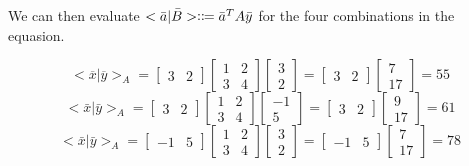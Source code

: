 \documentclass{article}
\begin{document}
We can then evaluate $<\bar{a}|\bar{B}> \vcentcolon \coloneqq \Bar{a}^TA\bar{y}$ for the four combinations in the equasion.

\begin{equation*}
    <\overline{x}|\overline{y}>_A = \begin{bmatrix}
        3 & 2
    \end{bmatrix}
    \begin{bmatrix}
        1&2\\3&4
    \end{bmatrix}
    \begin{bmatrix}
        3\\2
    \end{bmatrix}
    =
    \begin{bmatrix}
        3 & 2
    \end{bmatrix}
    \begin{bmatrix}
        7\\17
    \end{bmatrix}
    = 55
\end{equation*}
\begin{equation*}
    <\bar{x}|\bar{y}>_A = \begin{bmatrix}
        3 & 2
    \end{bmatrix}
    \begin{bmatrix}
        1&2\\3&4
    \end{bmatrix}
    \begin{bmatrix}
        -1\\5
    \end{bmatrix}
    =
    \begin{bmatrix}
        3 & 2
    \end{bmatrix}
    \begin{bmatrix}
        9\\17
    \end{bmatrix}
    = 61
\end{equation*}
\begin{equation*}
    <\bar{x}|\bar{y}>_A = \begin{bmatrix}
        -1 & 5
    \end{bmatrix}
    \begin{bmatrix}
        1&2\\3&4
    \end{bmatrix}
    \begin{bmatrix}
        3\\2
    \end{bmatrix}
    =
    \begin{bmatrix}
        -1 & 5
    \end{bmatrix}
    \begin{bmatrix}
        7\\17
    \end{bmatrix}
    = 78
\end{equation*}
\end{document}
